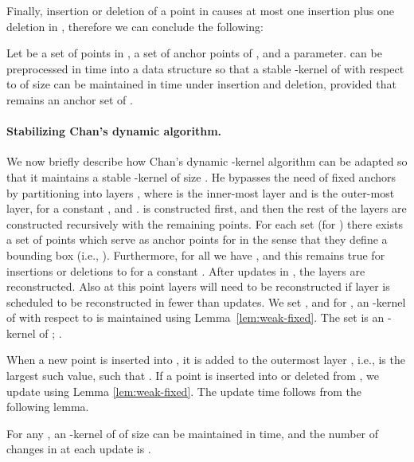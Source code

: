 \documentclass[11pt]{myclass}
\begin{document}
Finally, insertion or deletion of a point in  causes at most one insertion plus one deletion in , therefore we can conclude the following:

\begin{lemma}
\label{lem:strong-fixed}
Let  be a set of  points in ,  a set of 
anchor points of , and  a parameter. 
 can be preprocessed in  time into a 
data structure so that a stable -kernel of  with respect to 
of size  can be maintained in 
 time under insertion and deletion, 
provided that  remains an anchor set of .
\end{lemma}


\paragraph{Stabilizing Chan's dynamic algorithm.}
We now briefly describe how Chan's \cite{Cha08} dynamic -kernel algorithm can be adapted so that it maintains a stable -kernel of size . 
He bypasses the need of fixed anchors by partitioning  into  layers , where  is the inner-most layer and  is the outer-most layer,
 for a constant , and . 
 is constructed first, and then the rest of the layers are constructed recursively with the remaining points.
For each set  (for ) there exists a set of points  which serve as anchor points for  in the sense that 
they define a bounding box  (i.e., ).  Furthermore, for all  we have , and this remains true for  insertions or deletions to  for a constant .
After  updates in , the layers  are reconstructed. Also at this point layers  will need to be reconstructed if layer  is scheduled to be reconstructed in fewer than  updates.  
We set , and for , an -kernel  of  with respect to  is maintained using Lemma~\ref{lem:weak-fixed}.
The set  is an -kernel of ; 
.

When a new point  is inserted into , it is added to the outermost layer , i.e.,  is the largest such value, such that 
. If a point is inserted into or deleted from ,
we update  using Lemma \ref{lem:weak-fixed}. The update time follows
from the following lemma. 

\begin{lemma}\label{lemma:chan}
For any , an -kernel  of  of size  can be maintained in  time, and the number of changes in  at each update is .
\end{lemma}
\end{document}
